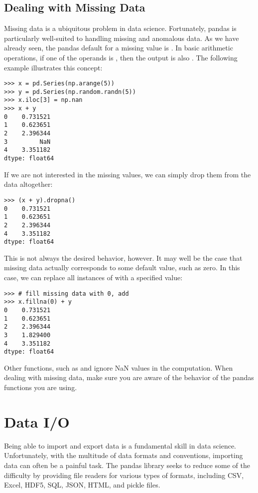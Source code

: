 \subsection*{Dealing with Missing Data} %

Missing data is a ubiquitous problem in data science.
Fortunately, pandas is particularly well-suited to
handling missing and anomalous data.
As we have already seen, the pandas default for a missing value is .
In basic arithmetic operations, if one of the operands is , then the output is also .
The following example illustrates this concept:
\begin{lstlisting}
>>> x = pd.Series(np.arange(5))
>>> y = pd.Series(np.random.randn(5))
>>> x.iloc[3] = np.nan
>>> x + y
0    0.731521
1    0.623651
2    2.396344
3         NaN
4    3.351182
dtype: float64
\end{lstlisting}

If we are not interested in the missing values, we can simply drop them from the data altogether:

\begin{lstlisting}
>>> (x + y).dropna()
0    0.731521
1    0.623651
2    2.396344
4    3.351182
dtype: float64
\end{lstlisting}

This is not always the desired behavior, however.
It may well be the case that missing data actually corresponds to
some default value, such as zero.
In this case, we can replace all instances of  with a specified value:
\begin{lstlisting}
>>> # fill missing data with 0, add
>>> x.fillna(0) + y
0    0.731521
1    0.623651
2    2.396344
3    1.829400
4    3.351182
dtype: float64
\end{lstlisting}

Other functions, such as  and  ignore NaN values in the computation.
When dealing with missing data, make sure you are aware of the behavior of the pandas functions you are using.

\section*{Data I/O} %

Being able to import and export data is a fundamental skill in data science.
Unfortunately, with the multitude of data formats and conventions, importing data can often be a painful task.
The pandas library seeks to reduce some of the difficulty by providing file readers for various types of formats,
including CSV, Excel, HDF5, SQL, JSON, HTML, and pickle files.

